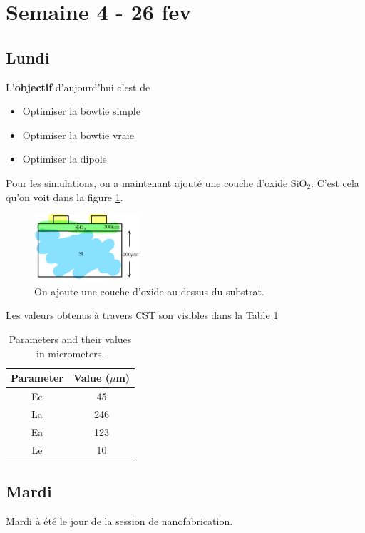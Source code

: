 \section{Semaine 4 - 26 fev}

\subsection{Lundi}

L'\textbf{objectif} d'aujourd'hui c'est de
\begin{itemize}
    \item Optimiser la bowtie simple
    \item Optimiser la bowtie vraie
    \item Optimiser la dipole
\end{itemize}

Pour les simulations, on a maintenant ajouté une couche d'oxide SiO$_{2}$. C'est cela qu'on voit dans la figure \ref{fig:oxide_film}.

\begin{figure}[h!]
    \centering
    \includegraphics[width=0.35\textwidth]{texfigures/ocide_film.png}
    \caption{\label{fig:oxide_film} On ajoute une couche d'oxide au-dessus du substrat.}
\end{figure}

Les valeurs obtenus à travers CST son visibles dans la Table \ref{tab:parameters}



\begin{table}[h!]
    \centering
    \begin{tabular}{|c|c|}
        \hline
        Parameter & Value ($\mu$m) \\
        \hline
        Ec & 45 \\
        La & 246 \\
        Ea & 123 \\
        Le & 10 \\
        \hline
    \end{tabular}
    \caption{Parameters and their values in micrometers.}
    \label{tab:parameters}
\end{table}

\subsection{Mardi}

Mardi à été le jour de la session de nanofabrication. 